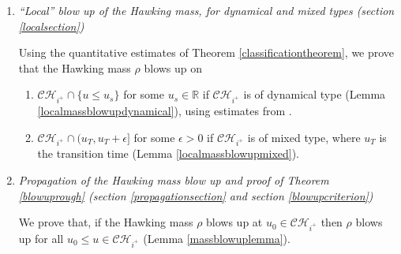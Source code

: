 \documentclass[10pt,a4paper]{article}
\theoremstyle{plain}
\theoremstyle{remark}
\theoremstyle{definition}
\newcommand{\RR}{\mathbb{R}}
\theoremstyle{plain}
\theoremstyle{remark}
\theoremstyle{definition}
\newcommand{\CH}{\mathcal{CH}_{i^+}}
\numberwithin{equation}{section}
\begin{document}
\begin{enumerate}
	From the Raychaudhuri equation, one can prove immediately that $\mathcal{S}_0$ is a past set: if \eqref{staticconditionintro} holds at $u_0$, then it holds for any $u \leq u_0$. Thus, we introduce the terminology of the classification, with three possible cases (Corollary \ref{threetypes}): \begin{enumerate}
		\item $S_0 =\emptyset$: we then say that $\CH$ is a Cauchy horizon of dynamical type.
		\item  $S_0 = \CH$: we then say that $\CH$ is a Cauchy horizon of static type.
		\item  $S_0 = (-\infty,u_T]$: we then say that $\CH$ is a Cauchy horizon of mixed type and $u_T$ is the transition time.
	\end{enumerate} In the next step, we will relate the dynamical and mixed Cauchy horizons to the blow up of the mass.
	
	\item \textit{``Local'' blow up of the Hawking mass, for dynamical and mixed types (section \ref{localsection})} \label{steplocalblowup}
	
	Using the quantitative estimates of Theorem \ref{classificationtheorem}, we prove that the Hawking mass $\rho$ blows up on \begin{enumerate}
		\item  $\CH \cap \{ u \leq u_s\}$ for some $u_s \in \RR$ if $\CH$ is of dynamical type (Lemma \ref{localmassblowupdynamical}), using estimates from \cite{Moi}.
		\item  $\CH \cap (u_T,u_T+\epsilon]$ for some $\epsilon>0$ if $\CH$ is of mixed type, where $u_T$ is the transition time (Lemma \ref{localmassblowupmixed}). 
	\end{enumerate} 
	
	\item \textit{Propagation of the Hawking mass blow up and proof of Theorem \ref{blowuprough} (section \ref{propagationsection} and section \ref{blowupcriterion})} \label{stepglobalblowup}
	
	We prove that, if the Hawking mass $\rho$ blows up at $u_0 \in \CH$ then $\rho$ blows up for all $u_0 \leq u \in \CH$ (Lemma \ref{massblowuplemma}).
	

\end{enumerate}
\end{document}
